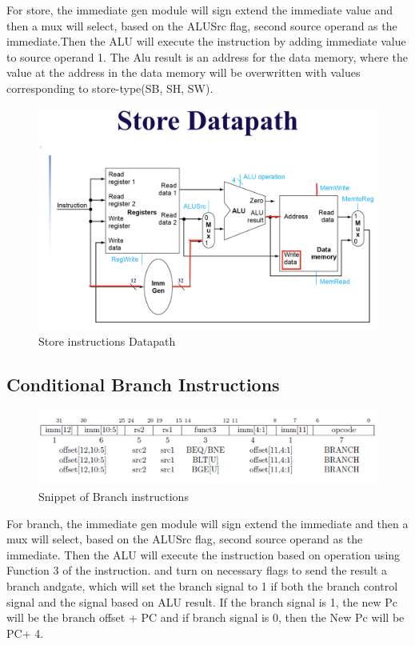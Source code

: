 \documentclass[20pt]{article}
\begin{document}
For store, the immediate gen module will sign extend the immediate value and then a mux will select, based on the ALUSrc flag,  second source operand as the immediate.Then the ALU will execute the instruction by adding immediate value to source operand 1. The Alu result is an address for the data memory, where the value at the address in the data memory  will be overwritten with  values corresponding to store-type(SB, SH, SW). 

\begin{figure}[H]
	\includegraphics[width=\linewidth]{Storedatapath}
	\caption{Store instructions Datapath}
\end{figure}

\newpage
\subsection{Conditional Branch Instructions}

\begin{figure}[H]
	\includegraphics[width=\linewidth]{Branch}
	\caption{Snippet of Branch instructions}
\end{figure}
For branch, the immediate gen module will sign extend the immediate and then a mux will select, based on the ALUSrc flag, second source operand as the immediate. Then the ALU will execute the instruction based on operation using Function 3 of the instruction. and turn on necessary flags to send the result a branch andgate, which will set the branch signal to 1 if both the branch control signal and the signal based on ALU result. If the branch signal is 1, the new Pc will be the branch offset + PC and if branch signal is 0, then the New Pc will be PC+ 4. 
\end{document}
